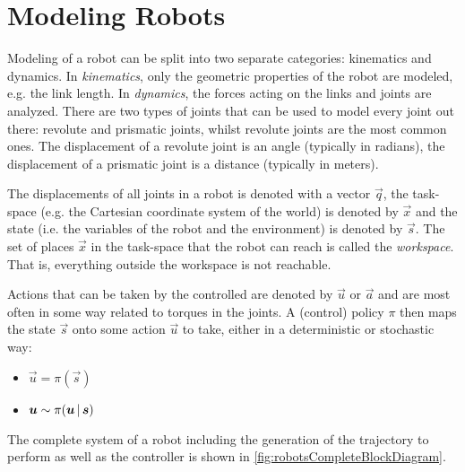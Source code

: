 	\section{Modeling Robots}
		Modeling of a robot can be split into two separate categories: kinematics and dynamics. In \emph{kinematics}, only the geometric properties of the robot are modeled, e.g. the link length. In \emph{dynamics}, the forces acting on the links and joints are analyzed. There are two types of joints that can be used to model every joint out there: revolute and prismatic joints, whilst revolute joints are the most common ones. The displacement of a revolute joint is an angle (typically in radians), the displacement of a prismatic joint is a distance (typically in meters).

		The displacements of all joints in a robot is denoted with a vector \(\vec{q}\), the task-space (e.g. the Cartesian coordinate system of the world) is denoted by \(\vec{x}\) and the state (i.e. the variables of the robot and the environment) is denoted by \(\vec{s}\). The set of places \(\vec{x}\) in the task-space that the robot can reach is called the \emph{workspace}. That is, everything outside the workspace is not reachable.

		Actions that can be taken by the controlled are denoted by \(\vec{u}\) or \(\vec{a}\) and are most often in some way related to torques in the joints. A (control) policy \(\pi\) then maps the state \(\vec{s}\) onto some action \(\vec{u}\) to take, either in a deterministic or stochastic way:
		\begin{itemize}
			\item {} \( \vec{u} = \pi(\vec{s}) \)
			\item {}    \( \bm{u} \sim \pi(\bm{u} \,\vert\, \bm{s}) \)
		\end{itemize}
		The complete system of a robot including the generation of the trajectory to perform as well as the controller is shown in \autoref{fig:robotsCompleteBlockDiagram}.

